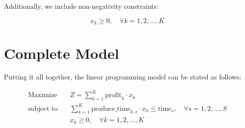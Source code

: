 \documentclass{article}
\begin{document}
Additionally, we include non-negativity constraints:

\[
x_{k} \geq 0, \quad \forall k = 1, 2, \ldots, K
\]

\section*{Complete Model}

Putting it all together, the linear programming model can be stated as follows:

\begin{align*}
\text{Maximize} & \quad Z = \sum_{k=1}^{K} \text{profit}_{k} \cdot x_{k} \\
\text{subject to} & \quad \sum_{k=1}^{K} \text{produce\_time}_{k,s} \cdot x_{k} \leq \text{time}_{s}, \quad \forall s = 1, 2, \ldots, S \\
& \quad x_{k} \geq 0, \quad \forall k = 1, 2, \ldots, K
\end{align*}
\end{document}
